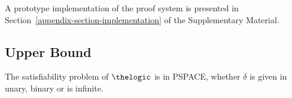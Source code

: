 
            

A prototype implementation of the proof system is presented in Section~\ref{appendix-section-implementation} of the Supplementary Material.


\subsection{Upper Bound}

\begin{theorem}
\label{th:satlogPSPACE}
The satisfiability problem of $\thelogic$ is in PSPACE, whether $\delta$ is given in unary, binary or is infinite.
\end{theorem}

